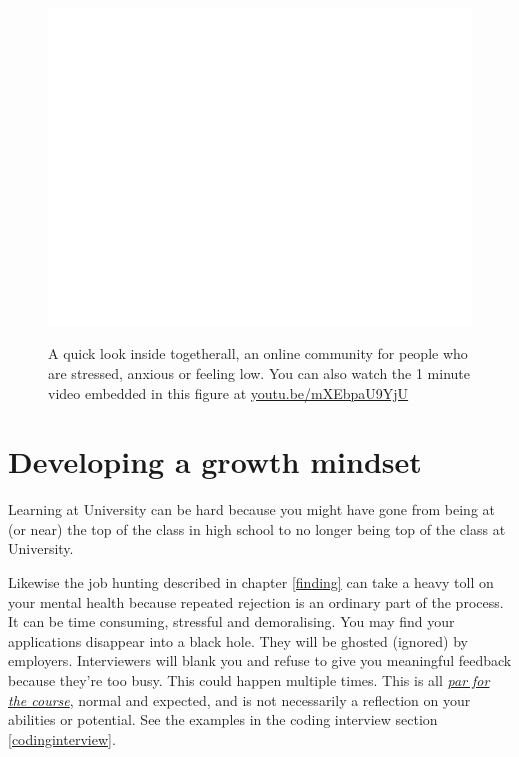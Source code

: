 \documentclass[
]{book}
\begin{document}
\begin{figure}

{\centering \href{https://youtube.com/embed/mXEbpaU9YjU}{\includegraphics[width=0.99\linewidth]{cdyf_files/figure-latex/togetherall-fig-1} }

}

\caption{A quick look inside togetherall, an online community for people who are stressed, anxious or feeling low. You can also watch the 1 minute video embedded in this figure at \href{https://youtu.be/mXEbpaU9YjU}{youtu.be/mXEbpaU9YjU} \citep{youtube-togetherall}}\label{fig:togetherall-fig}
\end{figure}



\hypertarget{growthmindset}{%
\section{Developing a growth mindset}\label{growthmindset}}

Learning at University can be hard because you might have gone from being at (or near) the top of the class in high school to no longer being top of the class at University.

Likewise the job hunting described in chapter \ref{finding} can take a heavy toll on your mental health because repeated rejection is an ordinary part of the process. It can be time consuming, stressful and demoralising. You may find your applications disappear into a black hole. They will be ghosted (ignored) by employers. Interviewers will blank you and refuse to give you meaningful feedback because they're too busy. This could happen multiple times. This is all \emph{\href{https://en.wiktionary.org/wiki/par_for_the_course}{par for the course}}, normal and expected, and is not necessarily a reflection on your abilities or potential. See the examples in the coding interview section \ref{codinginterview}. \citep{youtube-petia}
\end{document}

